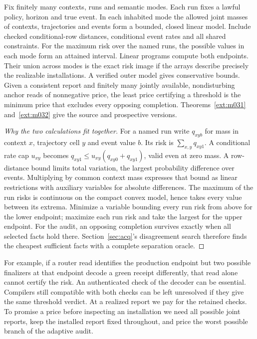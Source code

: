 \begin{theorem}\label{body:transport}
Fix finitely many contexts, runs and semantic modes. Each run fixes a lawful policy, horizon and true event. In each inhabited mode the allowed joint masses of contexts, trajectories and events form a bounded, closed linear model. Include checked conditional-row distances, conditional event rates and all shared constraints. For the maximum risk over the named runs, the possible values in each mode form an attained interval. Linear programs compute both endpoints. Their union across modes is the exact risk image if the arrays describe precisely the realizable installations. A verified outer model gives conservative bounds. Given a consistent report and finitely many jointly available, nondisturbing anchor reads of nonnegative price, the least price certifying a threshold is the minimum price that excludes every opposing completion. Theorems~\ref{ext:m031} and~\ref{ext:m032} give the source and prospective versions.
\end{theorem}
\begin{proof}[Why the two calculations fit together]
For a named run write \(q_{xyb}\) for mass in context \(x\), trajectory cell \(y\) and event value \(b\). Its risk is \(\sum_{x,y}q_{xy1}\). A conditional rate cap \(u_{xy}\) becomes \(q_{xy1}\le u_{xy}(q_{xy0}+q_{xy1})\), valid even at zero mass. A row-distance bound limits total variation, the largest probability difference over events. Multiplying by common context mass expresses that bound as linear restrictions with auxiliary variables for absolute differences. The maximum of the run risks is continuous on the compact convex model, hence takes every value between its extrema. Minimize a variable bounding every run risk from above for the lower endpoint; maximize each run risk and take the largest for the upper endpoint. For the audit, an opposing completion survives exactly when all selected facts hold there. Section~\ref{sec:acq}'s disagreement search therefore finds the cheapest sufficient facts with a complete separation oracle.
\end{proof}
For example, if a router read identifies the production endpoint but two possible finalizers at that endpoint decode a green receipt differently, that read alone cannot certify the risk. An authenticated check of the decoder can be essential. Compilers still compatible with both checks can be left unresolved if they give the same threshold verdict. At a realized report we pay for the retained checks. To promise a price before inspecting an installation we need all possible joint reports, keep the installed report fixed throughout, and price the worst possible branch of the adaptive audit.

